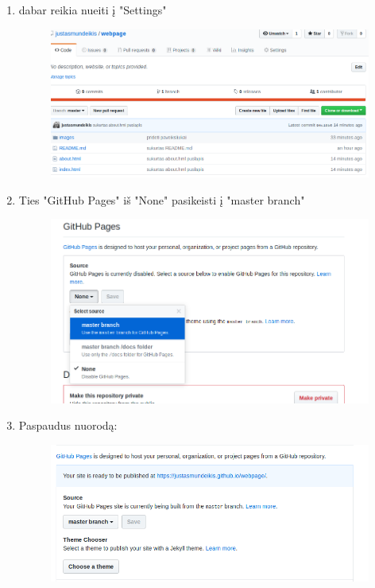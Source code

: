 \documentclass[11pt,a4paper]{article}
\begin{document}
\begin{enumerate}
\item dabar reikia nueiti į "Settings" 
\begin{figure}[H]
\center
\includegraphics[scale=0.4]{webpage_10.png}
\end{figure}

\item Ties "GitHub Pages" iš "None" pasikeisti į "master branch"

\begin{figure}[H]
\center
\includegraphics[scale=0.4]{webpage_11.png}
\end{figure}

\item Paspaudus nuorodą:
\begin{figure}[H]
\center
\includegraphics[scale=0.4]{webpage_12.png}
\end{figure}
 

\end{enumerate}
\end{document}
